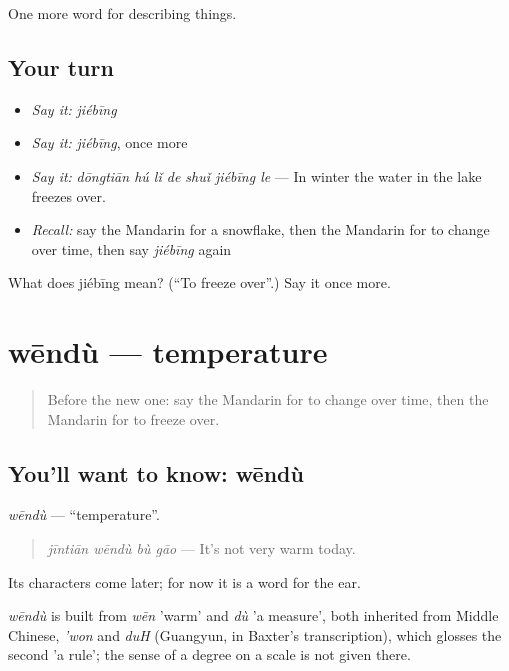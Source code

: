 \begin{grammarlens}[title={What you've built}]
One more word for describing things.
\end{grammarlens}

\subsection*{Your turn}
\begin{itemize}
\raggedright
  \item \emph{Say it:} \emph{jiébīng}
  \item \emph{Say it:} \emph{jiébīng}, once more
  \item \emph{Say it:} \emph{dōngtiān hú lǐ de shuǐ jiébīng le} — In winter the water in the lake freezes over.
  \item \emph{Recall:} say the Mandarin for a snowflake, then the Mandarin for to change over time, then say \emph{jiébīng} again
\end{itemize}

\begin{tcolorbox}[breakable,colback=teal!4,colframe=teal!35!black,title={Before you move on}]
What does jiébīng mean? (\textquotedblleft{}To freeze over\textquotedblright{}.) Say it once more.
\end{tcolorbox}
\section[wēndù]{wēndù — temperature}

\label{lesson:ZH-C243-wendu}



\begin{quote}
Before the new one: say the Mandarin for to change over time, then the Mandarin for to freeze over.
\end{quote}

\subsection*{You'll want to know: wēndù}
\emph{wēndù} — \textquotedblleft{}temperature\textquotedblright{}.

\begin{quote}
\emph{jīntiān wēndù bù gāo} — It's not very warm today.
\end{quote}

Its characters come later; for now it is a word for the ear.

\begin{cousinweb}
\emph{wēndù} is built from \emph{wēn} 'warm' and \emph{dù} 'a measure', both inherited from Middle Chinese, \emph{'won} and \emph{duH} (Guangyun, in Baxter's transcription), which glosses the second 'a rule'; the sense of a degree on a scale is not given there.
\end{cousinweb}

